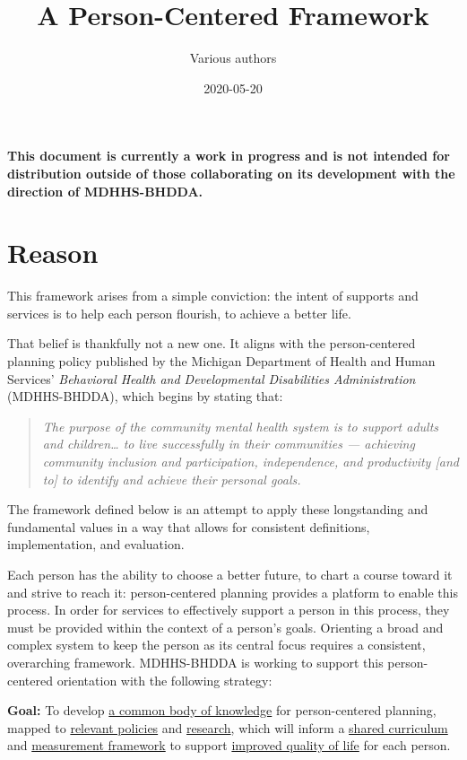 \documentclass[
]{book}
\title{A Person-Centered Framework}
\author{Various authors}
\date{2020-05-20}
\begin{document}
\maketitle

{
\setcounter{tocdepth}{1}
\tableofcontents
}
\textbf{This document is currently a work in progress and is not intended for distribution outside of those collaborating on its development with the direction of MDHHS-BHDDA.}

\hypertarget{reason}{%
\chapter{Reason}\label{reason}}

This framework arises from a simple conviction: the intent of supports and services is to help each person flourish, to achieve a better life.

That belief is thankfully not a new one. It aligns with the person-centered planning policy\citep{pcp-policy} published by the Michigan Department of Health and Human Services' \emph{Behavioral Health and Developmental Disabilities Administration} (MDHHS-BHDDA), which begins by stating that:

\begin{quote}
\emph{The purpose of the community mental health system is to support adults and children\ldots{} to live successfully in their communities --- achieving community inclusion and participation, independence, and productivity {[}and to{]} to identify and achieve their personal goals.}
\end{quote}

The framework defined below is an attempt to apply these longstanding and fundamental values in a way that allows for consistent definitions, implementation, and evaluation.

Each person has the ability to choose a better future, to chart a course toward it and strive to reach it: person-centered planning provides a platform to enable this process. In order for services to effectively support a person in this process, they must be provided within the context of a person's goals. Orienting a broad and complex system to keep the person as its central focus requires a consistent, overarching framework. MDHHS-BHDDA is working to support this person-centered orientation with the following strategy:

\textbf{Goal:} To develop \protect\hyperlink{bok}{a common body of knowledge} for person-centered planning,
mapped to \protect\hyperlink{policy}{relevant policies} and \protect\hyperlink{research}{research},
which will inform a \protect\hyperlink{curriculum}{shared curriculum}
and \protect\hyperlink{measure}{measurement framework}
to support \protect\hyperlink{pcpdca}{improved quality of life} for each person.
\end{document}
